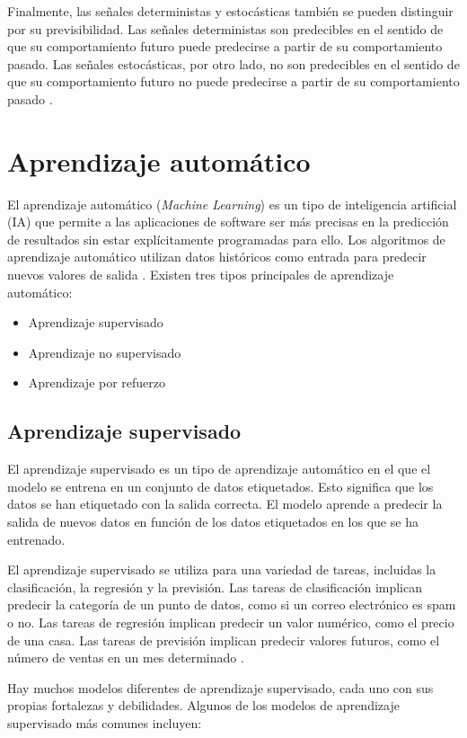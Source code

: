 Finalmente, las señales deterministas y estocásticas también se pueden distinguir por su previsibilidad. Las señales deterministas son predecibles en el sentido de que su comportamiento futuro puede predecirse a partir de su comportamiento pasado. Las señales estocásticas, por otro lado, no son predecibles en el sentido de que su comportamiento futuro no puede predecirse a partir de su comportamiento pasado \cite{Libro_SP_cocoro_neuro_app}.

\section{Aprendizaje automático}
El aprendizaje automático (\textit{Machine Learning}) es un tipo de inteligencia artificial (IA) que permite a las aplicaciones de software ser más precisas en la predicción de resultados sin estar explícitamente programadas para ello. Los algoritmos de aprendizaje automático utilizan datos históricos como entrada para predecir nuevos valores de salida \cite{G-Cloud_2023}. Existen tres tipos principales de aprendizaje automático:
\begin{itemize}
    \item Aprendizaje supervisado
    \item Aprendizaje no supervisado
    \item Aprendizaje por refuerzo
\end{itemize}


\subsection{Aprendizaje supervisado}
El aprendizaje supervisado es un tipo de aprendizaje automático en el que el modelo se entrena en un conjunto de datos etiquetados. Esto significa que los datos se han etiquetado con la salida correcta. El modelo aprende a predecir la salida de nuevos datos en función de los datos etiquetados en los que se ha entrenado.

El aprendizaje supervisado se utiliza para una variedad de tareas, incluidas la clasificación, la regresión y la previsión. Las tareas de clasificación implican predecir la categoría de un punto de datos, como si un correo electrónico es spam o no. Las tareas de regresión implican predecir un valor numérico, como el precio de una casa. Las tareas de previsión implican predecir valores futuros, como el número de ventas en un mes determinado \cite{G-Cloud_2023}.

Hay muchos modelos diferentes de aprendizaje supervisado, cada uno con sus propias fortalezas y debilidades. Algunos de los modelos de aprendizaje supervisado más comunes incluyen:

